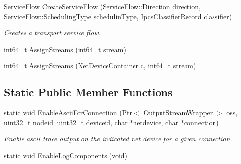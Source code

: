 \begin{DoxyCompactItemize}
\item 
\hyperlink{classns3_1_1ServiceFlow}{Service\+Flow} \hyperlink{classns3_1_1WimaxHelper_aed0c1ffdcd62234c14965f899efc88c1}{Create\+Service\+Flow} (\hyperlink{classns3_1_1ServiceFlow_ae14b8dc8bb371bad10fe078110655d4f}{Service\+Flow\+::\+Direction} direction, \hyperlink{classns3_1_1ServiceFlow_a7990ba10be1e098328fd1e6382a26235}{Service\+Flow\+::\+Scheduling\+Type} schedulin\+Type, \hyperlink{classns3_1_1IpcsClassifierRecord}{Ipcs\+Classifier\+Record} \hyperlink{design_8txt_af9e6b398b148789960232a87c72a107e}{classifier})
\begin{DoxyCompactList}\small\item\em Creates a transport service flow. \end{DoxyCompactList}\item 
int64\+\_\+t \hyperlink{classns3_1_1WimaxHelper_a88c8219af519646a98ccc8bca7a0eb0f}{Assign\+Streams} (int64\+\_\+t stream)
\item 
int64\+\_\+t \hyperlink{classns3_1_1WimaxHelper_a336831569914bf3ab4617f6f49b59b50}{Assign\+Streams} (\hyperlink{classns3_1_1NetDeviceContainer}{Net\+Device\+Container} \hyperlink{mmwave_2model_2fading-traces_2fading__trace__generator_8m_ae0323a9039add2978bf5b49550572c7c}{c}, int64\+\_\+t stream)
\end{DoxyCompactItemize}
\subsection*{Static Public Member Functions}
\begin{DoxyCompactItemize}
\item 
static void \hyperlink{classns3_1_1WimaxHelper_a8d815ff3b909964ceb84feb9a688f9d5}{Enable\+Ascii\+For\+Connection} (\hyperlink{classns3_1_1Ptr}{Ptr}$<$ \hyperlink{classns3_1_1OutputStreamWrapper}{Output\+Stream\+Wrapper} $>$ oss, uint32\+\_\+t nodeid, uint32\+\_\+t deviceid, char $\ast$netdevice, char $\ast$connection)
\begin{DoxyCompactList}\small\item\em Enable ascii trace output on the indicated net device for a given connection. \end{DoxyCompactList}\item 
static void \hyperlink{classns3_1_1WimaxHelper_a31da3d96f3aa8d48749625ee8e148af7}{Enable\+Log\+Components} (void)
\end{DoxyCompactItemize}
